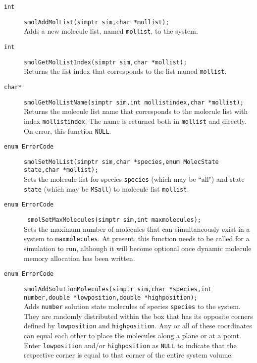 \documentclass {book}
\begin{document}
\begin{description}
\item[\texttt{int}]
\texttt{smolAddMolList(simptr sim,char *mollist);}
\hfill \\
Adds a new molecule list, named \texttt{mollist}, to the system.

\item[\texttt{int}]
\texttt{smolGetMolListIndex(simptr sim,char *mollist);}
\hfill \\
Returns the list index that corresponds to the list named \texttt{mollist}.

\item[\texttt{char*}]
\texttt{smolGetMolListName(simptr sim,int mollistindex,char *mollist);}
\hfill \\
Returns the molecule list name that corresponds to the molecule list with index \texttt{mollistindex}.  The name is returned both in \texttt{mollist} and directly.  On error, this function \texttt{NULL}.

\item[\texttt{enum ErrorCode}]
\texttt{smolSetMolList(simptr sim,char *species,enum MolecState state,char *mollist);}
\hfill \\
Sets the molecule list for species \texttt{species} (which may be ``all") and state \texttt{state} (which may be \texttt{MSall}) to molecule list \texttt{mollist}.

\item[\texttt{enum ErrorCode}]
\texttt{ smolSetMaxMolecules(simptr sim,int maxmolecules);}
\hfill \\
Sets the maximum number of molecules that can simultaneously exist in a system to \texttt{maxmolecules}.  At present, this function needs to be called for a simulation to run, although it will become optional once dynamic molecule memory allocation has been written.

\item[\texttt{enum ErrorCode}]
\texttt{smolAddSolutionMolecules(simptr sim,char *species,int number,double *lowposition,double *highposition);}
\hfill \\
Adds \texttt{number} solution state molecules of species \texttt{species} to the system.  They are randomly distributed within the box that has its opposite corners defined by \texttt{lowposition} and \texttt{highposition}.  Any or all of these coordinates can equal each other to place the molecules along a plane or at a point.  Enter \texttt{lowposition} and/or \texttt{highposition} as \texttt{NULL} to indicate that the respective corner is equal to that corner of the entire system volume.


\end{description}
\end{document}
